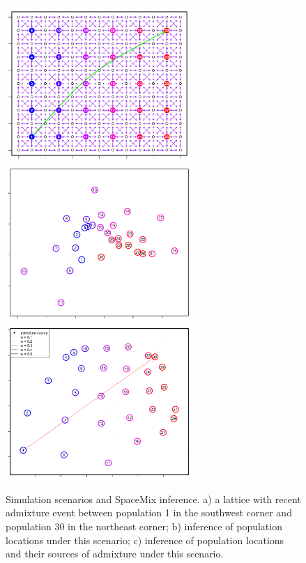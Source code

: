 \documentclass[12pt]{article}
\begin{document}
\begin{figure}
	\centering
			{\includegraphics[width=2.8in,height=2.33in]{figs/sims/corner_admixture_lattice.png}}
			{\includegraphics[width=2.8in,height=2.33in]{figs/sims/GeoGenMap_corner_admixture_CYOL.pdf}}
			{\includegraphics[width=2.8in,height=2.33in]{figs/sims/GeoGenMap_corner_admixture.png}}
	\caption{Simulation scenarios and SpaceMix inference.  a) a lattice with recent admixture event between population 1 in the southwest corner and population 30 in the northeast corner; b) inference of population locations under this scenario; c) inference of population locations and their sources of admixture under this scenario.}\label{sfig:corner_admix_scenarios}
\end{figure}
\end{document}
